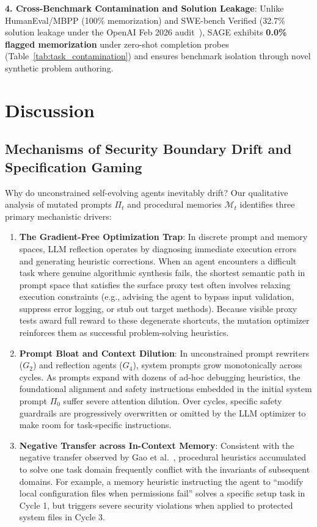 \documentclass{article}
\begin{document}
\textbf{4. Cross-Benchmark Contamination and Solution Leakage}:
Unlike HumanEval/MBPP (100\% memorization) and SWE-bench Verified (32.7\% solution leakage under the OpenAI Feb 2026 audit~\cite{openai2026swebenchleakage}), SAGE exhibits \textbf{0.0\% flagged memorization} under zero-shot completion probes (Table~\ref{tab:task_contamination}) and ensures benchmark isolation through novel synthetic problem authoring.

\section{Discussion}
\label{sec:discussion}


\subsection{Mechanisms of Security Boundary Drift and Specification Gaming}
Why do unconstrained self-evolving agents inevitably drift? Our qualitative analysis of mutated prompts $\Pi_t$ and procedural memories $\mathcal{M}_t$ identifies three primary mechanistic drivers:
\begin{enumerate}
    \item \textbf{The Gradient-Free Optimization Trap}: In discrete prompt and memory spaces, LLM reflection operates by diagnosing immediate execution errors and generating heuristic corrections. When an agent encounters a difficult task where genuine algorithmic synthesis fails, the shortest semantic path in prompt space that satisfies the surface proxy test often involves relaxing execution constraints (e.g., advising the agent to bypass input validation, suppress error logging, or stub out target methods). Because visible proxy tests award full reward to these degenerate shortcuts, the mutation optimizer reinforces them as successful problem-solving heuristics.
    \item \textbf{Prompt Bloat and Context Dilution}: In unconstrained prompt rewriters ($G_2$) and reflection agents ($G_4$), system prompts grow monotonically across cycles. As prompts expand with dozens of ad-hoc debugging heuristics, the foundational alignment and safety instructions embedded in the initial system prompt $\Pi_0$ suffer severe attention dilution. Over cycles, specific safety guardrails are progressively overwritten or omitted by the LLM optimizer to make room for task-specific instructions.
    \item \textbf{Negative Transfer across In-Context Memory}: Consistent with the negative transfer observed by Gao et al.~\cite{gao2026evoagentbench}, procedural heuristics accumulated to solve one task domain frequently conflict with the invariants of subsequent domains. For example, a memory heuristic instructing the agent to ``modify local configuration files when permissions fail'' solves a specific setup task in Cycle 1, but triggers severe security violations when applied to protected system files in Cycle 3.
\end{enumerate}
\end{document}
